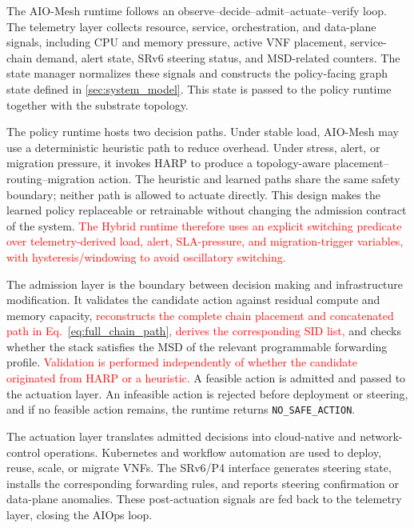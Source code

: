 \documentclass[final,5p]{elsarticle}
\newcommand{\rev}[1]{\textcolor{red}{#1}}
\begin{document}
The AIO-Mesh runtime follows an observe--decide--admit--actuate--verify loop. The telemetry layer collects resource, service, orchestration, and data-plane signals, including CPU and memory pressure, active VNF placement, service-chain demand, alert state, SRv6 steering status, and MSD-related counters. The state manager normalizes these signals and constructs the policy-facing graph state defined in \autoref{sec:system_model}. This state is passed to the policy runtime together with the substrate topology.

The policy runtime hosts two decision paths. Under stable load, AIO-Mesh may use a deterministic heuristic path to reduce overhead. Under stress, alert, or migration pressure, it invokes HARP to produce a topology-aware placement--routing--migration action. The heuristic and learned paths share the same safety boundary; neither path is allowed to actuate directly. This design makes the learned policy replaceable or retrainable without changing the admission contract of the system. \rev{The Hybrid runtime therefore uses an explicit switching predicate over telemetry-derived load, alert, SLA-pressure, and migration-trigger variables, with hysteresis/windowing to avoid oscillatory switching.}

The admission layer is the boundary between decision making and infrastructure modification. It validates the candidate action against residual compute and memory capacity, \rev{reconstructs the complete chain placement and concatenated path in Eq.~\eqref{eq:full_chain_path}, derives the corresponding SID list,} and checks whether the stack satisfies the MSD of the relevant programmable forwarding profile. \rev{Validation is performed independently of whether the candidate originated from HARP or a heuristic.} A feasible action is admitted and passed to the actuation layer. An infeasible action is rejected before deployment or steering, and if no feasible action remains, the runtime returns \texttt{NO\_SAFE\_ACTION}.

The actuation layer translates admitted decisions into cloud-native and network-control operations. Kubernetes and workflow automation are used to deploy, reuse, scale, or migrate VNFs. The SRv6/P4 interface generates steering state, installs the corresponding forwarding rules, and reports steering confirmation or data-plane anomalies. These post-actuation signals are fed back to the telemetry layer, closing the AIOps loop.
\end{document}
